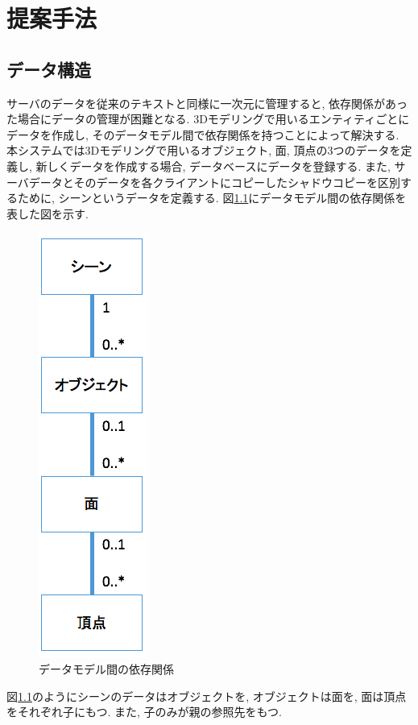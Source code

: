 \chapter{提案手法} \label{chap:method}

\section{データ構造}
サーバのデータを従来のテキストと同様に一次元に管理すると, 依存関係があった場合にデータの管理が困難となる.
3Dモデリングで用いるエンティティごとにデータを作成し, そのデータモデル間で依存関係を持つことによって解決する.
本システムでは3Dモデリングで用いるオブジェクト, 面, 頂点の3つのデータを定義し, 新しくデータを作成する場合, データベースにデータを登録する.
また, サーバデータとそのデータを各クライアントにコピーしたシャドウコピーを区別するために, シーンというデータを定義する.
図\ref{データ構造}にデータモデル間の依存関係を表した図を示す.
\begin{figure}[htbp]
  \begin{center}
    \includegraphics[scale=0.5]{images/er}
    \caption{データモデル間の依存関係}
    \label{データ構造}
  \end{center}
\end{figure}
図\ref{データ構造}のようにシーンのデータはオブジェクトを, オブジェクトは面を, 面は頂点をそれぞれ子にもつ. また, 子のみが親の参照先をもつ.

